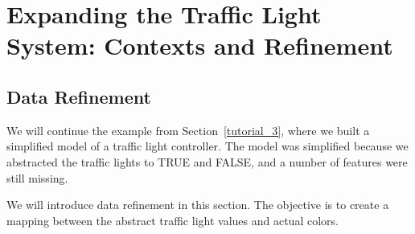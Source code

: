 \section{Expanding the Traffic Light System: Contexts and Refinement}
\label{tutorial_7}


\subsection{Data Refinement}

We will continue the example from Section~\ref{tutorial_3}, where we built a simplified model of a traffic light controller.  The model was simplified because we abstracted the traffic lights to TRUE and FALSE, and a number of features were still missing.

We will introduce data refinement in this section.  The objective is to create a mapping between the abstract traffic light values and actual colors.


